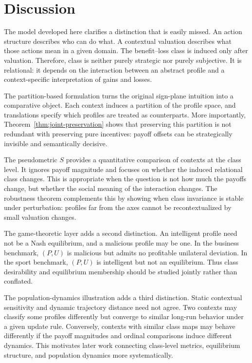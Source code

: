 \documentclass[a4paper,fleqn]{cas-dc}
\theoremstyle{remark}
\begin{document}
\FloatBarrier
\section{Discussion}
\label{sec:discussion}

The model developed here clarifies a distinction that is easily missed. An action structure describes who can do what. A contextual valuation describes what those actions mean in a given domain. The benefit--loss class is induced only after valuation. Therefore, class is neither purely strategic nor purely subjective. It is relational: it depends on the interaction between an abstract profile and a context-specific interpretation of gains and losses.

The partition-based formulation turns the original sign-plane intuition into a
comparative object. Each context induces a partition of the profile space, and
translations specify which profiles are treated as counterparts. More
importantly, Theorem~\ref{thm:joint-preservation} shows that preserving this
partition is not redundant with preserving pure incentives: payoff offsets can
be strategically invisible and semantically decisive.

The pseudometric $S$ provides a quantitative comparison of contexts at the class level. It ignores payoff magnitude and focuses on whether the induced relational class changes. This is appropriate when the question is not how much the payoffs change, but whether the social meaning of the interaction changes. The robustness theorem complements this by showing when class invariance is stable under perturbation: profiles far from the axes cannot be recontextualized by small valuation changes.

The game-theoretic layer adds a second distinction. An intelligent profile need not be a Nash equilibrium, and a malicious profile may be one. In the business benchmark, $(P,U)$ is malicious but admits no profitable unilateral deviation. In the sport benchmark, $(P,U)$ is intelligent but not an equilibrium. Thus class desirability and equilibrium membership should be studied jointly rather than conflated.

The population-dynamics illustration adds a third distinction. Static contextual sensitivity and dynamic trajectory distance need not agree. Two contexts may classify some profiles differently but converge to similar long-run behavior under a given update rule. Conversely, contexts with similar class maps may behave differently if the payoff magnitudes and ordinal comparisons induce different dynamics. This motivates later work connecting class-level metrics, equilibrium structure, and population dynamics more systematically.
\end{document}
